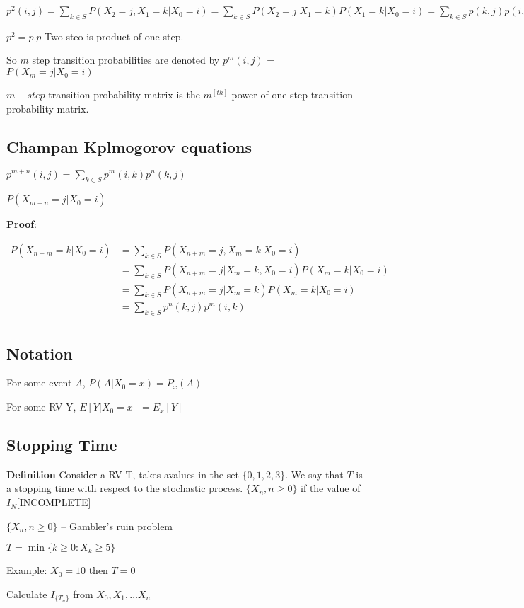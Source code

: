 \documentclass{article}
\begin{document}
$p^2(i,j) = \sum_{k \in S} P(X_2=j, X_1=k|X_0=i) = \sum_{k \in S} P(X_2=j|X_1=k) P(X_1=k|X_0=i) = \sum_{k \in S} p(k,j)p(i,k)$

$p^2 = p . p$ Two steo is product of one step.

So $m$ step transition probabilities are denoted by $p^m(i,j)$ 
= $P(X_m=j|X_0=i)$

$m-step$ transition probability matrix is the $m^[th]$ power of one step transition probability matrix.


\subsection{Champan Kplmogorov equations}

$p^{m+n}(i,j) = \sum_{k \in S} p^m(i,k)p^n(k,j)$
 
$P(X_{m+n}=j|X_0=i)$ 

\textbf{Proof}: 

\begin{align*}
P(X_{n+m}=k|X_0=i) &= \sum_{k \in S} P(X_{n+m}=j, X_m=k| X_0=i)\\
&= \sum_{k \in S} P(X_{n+m}=j | X_m=k, X_0=i)P(X_m=k|X_0=i)\\
&= \sum_{k \in S} P(X_{n+m}=j | X_m=k)P(X_m=k|X_0=i)\\
&= \sum_{k \in S} p^n(k,j)p^m(i,k)\\
\end{align*}

\subsection*{Notation}
For some event $A$, $P(A|X_0=x) = P_x(A)$

For some RV Y, $E[Y|X_0=x] = E_x[Y]$

\subsection*{Stopping Time}

\textbf{Definition} Consider a RV T, takes avalues in the set $ \{0,1,2,3 \}$. We say that $T$ is a stopping time with respect to the stochastic process. $\{X_n, n \geq 0 \}$ if the value of $I_{N}$[INCOMPLETE]

$\{X_n, n \geq 0\}$ -- Gambler's ruin problem

$ T = \min\{k \geq 0: X_k \geq 5\}$


Example: $X_0 = 10$ then $T=0$

Calculate $I_{\{T_n\}}$ from $X_0, X_1, \dots X_n$
\end{document}
